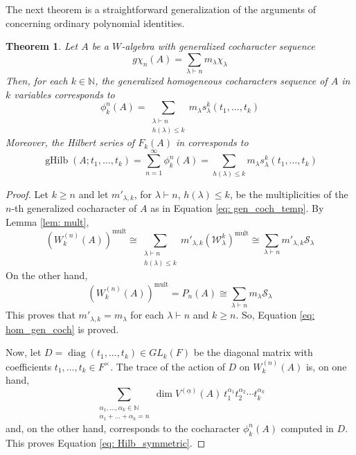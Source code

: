 \documentclass{article}
\newtheorem{theorem}{Theorem}[section]
\newcommand{\bN}{\mathbb{N}}
\newcommand{\cS}{\mathcal{S}}
\newcommand{\cW}{\mathcal{W}}
\DeclareMathOperator{\diag}{diag}
\DeclareMathOperator{\Hilb}{gHilb}
\DeclareMathOperator{\mult}{mult}
\begin{document}
The next theorem is a straightforward generalization of the arguments of \cite{Ber82} concerning ordinary polynomial identities.

\begin{theorem}\label{th: Hilbert}
	Let $A$ be a $W$-algebra with generalized cocharacter sequence \begin{equation}\label{eq: gen_coch}
		g\chi_n(A) = \sum_{\lambda\vdash n} m_\lambda \chi_\lambda
	\end{equation} 
	Then, for each $k\in\bN$, the generalized homogeneous cocharacters sequence of $A$ in $k$ variables corresponds to 
	\begin{equation}\label{eq: hom_gen_coch}
		\phi_k^n(A) = \sum_{\substack{\lambda\vdash n \\ h(\lambda)\leq k}} m_{\lambda} s^k_\lambda(t_1,\dots,t_k)
	\end{equation}
	Moreover, the Hilbert series of $F_k(A)$ in corresponds to 
	\begin{equation}\label{eq: Hilb_symmetric}
		\Hilb(A;t_1,\dots,t_k) = \sum_{n=1}^\infty \phi_k^n(A) = \sum_{h(\lambda)\leq k} m_\lambda s^k_\lambda(t_1,\dots,t_k)
	\end{equation}
\end{theorem}
\begin{proof}
 	
	Let $k\geq n$ and let $m'_{\lambda,k}$, for $\lambda\vdash n$, $ h(\lambda)\leq k$, be the multiplicities of the $n$-th generalized cocharacter of $A$ as in Equation \eqref{eq: gen_coch_temp}.
	By Lemma \ref{lem: mult},
	\[  (W_k^{(n)}(A))^{\mult } \cong \sum_{\substack{\lambda\vdash n \\ h(\lambda)\leq k}} m'_{\lambda,k} (\cW_\lambda^k)^{\mult} \cong \sum_{\lambda\vdash n } m'_{\lambda,k} \cS_\lambda \]
	On the other hand, 
	\[ (W_k^{(n)}(A))^{\mult } = P_n(A) \cong \sum_{\lambda\vdash n} m_\lambda \cS_\lambda \]
	This proves that $m'_{\lambda,k} = m_\lambda$ for each $\lambda\vdash n$ and $k\geq n$. So, Equation \eqref{eq: hom_gen_coch} is proved.
	
	Now, let $D=\diag(t_1,\dots,t_k)\in GL_k(F)$ be the diagonal matrix with coefficients $t_1,\dots,t_k\in F^\times$. The trace of the action of $D$ on $W_k^{(n)}(A)$ is, on one hand, 
	\[ \sum_{\substack{\alpha_1,\dots,\alpha_k\in\bN \\ \alpha_1+\dots+\alpha_k = n}} \dim V^{(\underline{\alpha})}(A)\  t_1^{\alpha_1} t_2^{\alpha_2}  \cdots t_k^{\alpha_k} \]
	and, on the other hand, corresponds to the cocharacter $\phi_k^n(A)$ computed in $D$. This proves Equation \eqref{eq: Hilb_symmetric}.
\end{proof}
\end{document}
